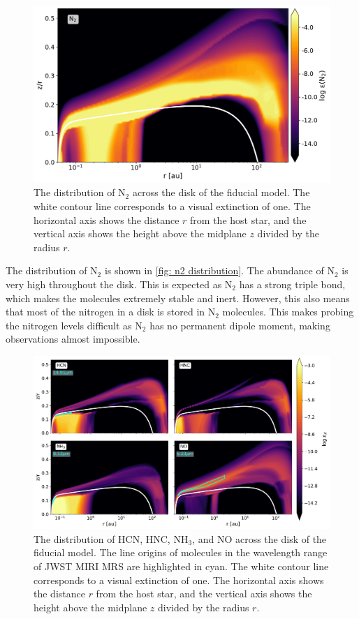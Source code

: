 \documentclass[oneside, single, authoryear, semicolon, 12pt]{lion-msc}
\newcommand{\4}{$_4$}
\newcommand{\3}{$_3$}
\newcommand{\2}{$_2$}
\begin{document}
\begin{figure}[H]
    \centering
    \includegraphics[width=.8\linewidth]{Figures/AbundanceN2.pdf}
    \caption{The distribution of N\2 across the disk of the fiducial model. The white contour line corresponds to a visual extinction of one. The horizontal axis shows the distance $r$ from the host star, and the vertical axis shows the height above the midplane $z$ divided by the radius $r$.}
    \label{fig: n2 distribution}
\end{figure}

The distribution of N\2 is shown in \autoref{fig: n2 distribution}. The abundance of N\2 is very high throughout the disk. This is expected as N\2 has a strong triple bond, which makes the molecules extremely stable and inert. However, this also means that most of the nitrogen in a disk is stored in N\2 molecules. This makes probing the nitrogen levels difficult as N\2 has no permanent dipole moment, making observations almost impossible.

\begin{figure}[H]
    \centering
    \includegraphics[width=\linewidth]{Figures/Abundance2.pdf}
    \caption{The distribution of HCN, HNC, NH\3, and NO across the disk of the fiducial model. The line origins of molecules in the wavelength range of JWST MIRI MRS are highlighted in cyan. The white contour line corresponds to a visual extinction of one. The horizontal axis shows the distance $r$ from the host star, and the vertical axis shows the height above the midplane $z$ divided by the radius $r$.}
    \label{fig: nitrogen distribution}
\end{figure}
\end{document}
